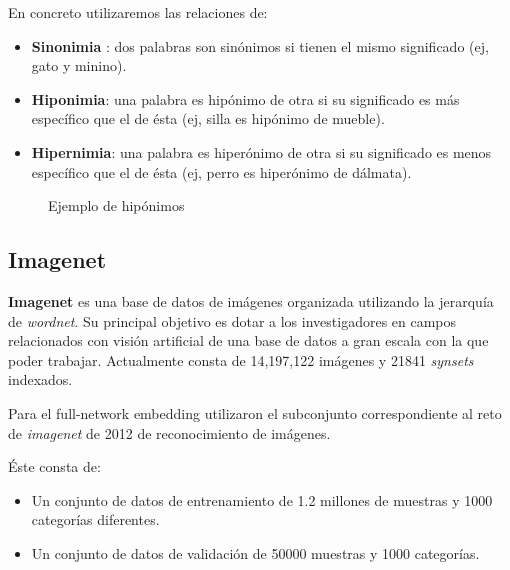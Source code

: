 \documentclass[12,twoside]{TFG-GM}
\theoremstyle{definition}
\theoremstyle{remark}
\begin{document}
En concreto utilizaremos las relaciones de: 
\begin{itemize}

\item \textbf{Sinonimia} : dos palabras son sinónimos si tienen el mismo significado (ej, gato y minino).
\item \textbf{Hiponimia}: una palabra es hipónimo de otra si su significado es más específico que el de ésta (ej, silla es hipónimo de mueble). 
\item \textbf{Hipernimia}: una palabra es hiperónimo de otra si su significado es menos específico que el de ésta (ej, perro es hiperónimo de dálmata). 
 
\end{itemize}

\begin{figure}[H]
\centering

\caption{Ejemplo de hipónimos}
\end{figure}

\subsection{Imagenet}

\textbf{Imagenet} es una base de datos de imágenes organizada utilizando la jerarquía de \textit{wordnet}. Su principal objetivo es dotar a los investigadores en campos relacionados con visión artificial de una base de datos a gran escala con la que poder trabajar. Actualmente consta de 14,197,122 imágenes y  21841 \textit{synsets} indexados.  

Para el full-network embedding utilizaron el subconjunto correspondiente al reto de \textit{imagenet} de 2012 de reconocimiento de imágenes. 

Éste consta de:
\begin{itemize}
\item Un conjunto de datos de entrenamiento de 1.2 millones de muestras y 1000 categorías diferentes.
\item Un conjunto de datos de validación de 50000 muestras y 1000 categorías. 
\end{itemize}
\end{document}
